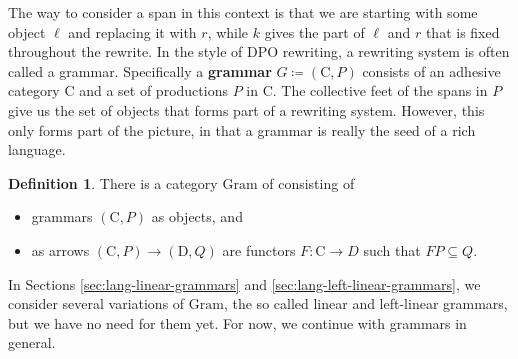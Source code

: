 \documentclass{amsart}
\newcommand{\C}{\cat{C}}
\newcommand{\D}{\cat{D}}
\newcommand{\Gram}{\cat{Gram}}
\newcommand{\defn}[1]{\textbf{#1}}
\newcommand{\cat}[1]{\mathrm{#1}}
\newcommand{\from}{\colon}
\theoremstyle{remark}
\theoremstyle{definition}
\newtheorem{definition}[theorem]{Definition}
\begin{document}
The way to consider a span in this context is that we are starting
with some object $ \ell $ and replacing it with $ r $, while $ k $
gives the part of $ \ell $ and $ r $ that is fixed throughout the
rewrite.  In the style of DPO rewriting, a rewriting system is often
called a grammar. Specifically a \defn{grammar}
$ G \coloneqq ( \C , P ) $ consists of an adhesive category $ \C $ and
a set of productions $ P $ in $ \C $. The collective feet of the spans
in $ P $ give us the set of objects that forms part of a rewriting
system.  However, this only forms part of the picture, in that a
grammar is really the seed of a rich language.

\begin{definition}
  There is a category $ \Gram $ of consisting of
  \begin{itemize}
  \item grammars $ ( \C , P ) $ as objects, and
  \item as arrows $ ( \C , P ) \to ( \D , Q ) $ are functors $ F \from
    \C \to D $ such that $ FP \subseteq Q $.
  \end{itemize}
\end{definition}

In Sections \ref{sec:lang-linear-grammars} and
\ref{sec:lang-left-linear-grammars}, we consider several variations of
$ \Gram $, the so called linear and left-linear grammars, but we have
no need for them yet. For now, we continue with grammars in general.
\end{document}
